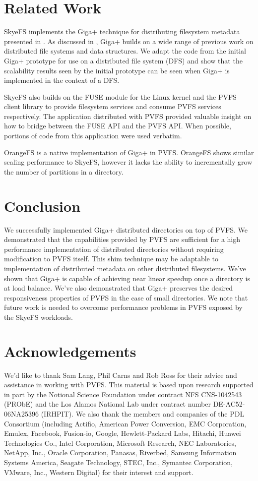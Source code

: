 \documentclass[onecolumn, 11pt, letterpaper]{article}
\begin{document}
\section{Related Work}
SkyeFS implements the Giga+ technique for distributing filesystem metadata
presented in \cite{gigaplus}.  As discussed in \cite{gigaplus}, Giga+ builds
on a wide range of previous work on distributed file systems and data
structures.  We adapt the code from the initial Giga+ prototype for use on a
distributed file system (DFS) and show that the scalability results seen by
the initial prototype can be seen when Giga+ is implemented in the context of
a DFS.

SkyeFS also builds on the FUSE module for the Linux kernel and the PVFS client
library to provide filesystem services and consume PVFS services respectively.
The  application distributed with PVFS provided valuable
insight on how to bridge between the FUSE API and the PVFS API.  When
possible, portions of code from this application were used verbatim.

OrangeFS is a native implementation of Giga+ in PVFS.\cite{orange}  OrangeFS
shows similar scaling performance to SkyeFS, however it lacks the ability to
incrementally grow the number of partitions in a directory.

\section{Conclusion}
We successfully implemented Giga+ distributed directories on top of PVFS.  We
demonstrated that the capabilities provided by PVFS are sufficient for a high
performance implementation of distributed directories without requiring
modification to PVFS itself.  This shim technique may be adaptable to
implementation of distributed metadata on other distributed filesystems.
We've shown that Giga+ is capable of achieving near linear speedup once a
directory is at load balance.  We've also demonstrated that Giga+ preserves
the desired responsiveness properties of PVFS in the case of small
directories.  We note that future work is needed to overcome performance
problems in PVFS exposed by the SkyeFS workloads.

\section*{Acknowledgements}
We'd like to thank Sam Lang, Phil Carns and Rob Ross for their advice and
assistance in working with PVFS.  This material is based upon research
supported in part by the Notional Science Foundation under contract NFS
CNS-1042543 (PRObE) and the Los Alamos National Lab under contract number
DE-AC52-06NA25396 (IRHPIT).  We also thank the members and companies of the
PDL Consortium (including Actifio, American Power Conversion, EMC Corporation,
Emulex, Facebook, Fusion-io, Google, Hewlett-Packard Labs, Hitachi, Huawei
Technologies Co., Intel Corporation, Microsoft Research, NEC Laboratories,
NetApp, Inc., Oracle Corporation, Panasas, Riverbed, Samsung Information
Systems America, Seagate Technology, STEC, Inc., Symantec Corporation, VMware,
Inc., Western Digital) for their interest and support.
\end{document}
